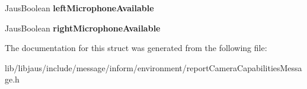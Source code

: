 \begin{DoxyCompactItemize}
\item 
\hypertarget{struct_report_camera_capabilities_message_struct_a06f3a2a2a4591ee564a56dd5bd4a6af1}{\-Jaus\-Boolean {\bfseries left\-Microphone\-Available}}\label{struct_report_camera_capabilities_message_struct_a06f3a2a2a4591ee564a56dd5bd4a6af1}

\item 
\hypertarget{struct_report_camera_capabilities_message_struct_a74878036cd1c1efc0973ab5385f49ee0}{\-Jaus\-Boolean {\bfseries right\-Microphone\-Available}}\label{struct_report_camera_capabilities_message_struct_a74878036cd1c1efc0973ab5385f49ee0}

\end{DoxyCompactItemize}


\-The documentation for this struct was generated from the following file\-:\begin{DoxyCompactItemize}
\item 
lib/libjaus/include/message/inform/environment/report\-Camera\-Capabilities\-Message.\-h\end{DoxyCompactItemize}
